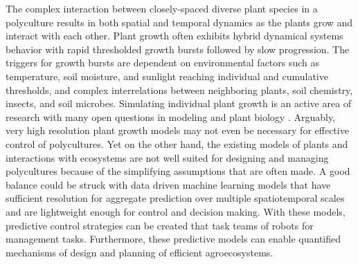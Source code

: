 The complex interaction between closely-spaced diverse plant species in a polyculture results in both spatial and temporal dynamics as the plants grow and interact with each other. %
Plant growth often exhibits hybrid dynamical systems behavior with rapid thresholded growth bursts followed by slow progression. The triggers for growth bursts are dependent on  environmental factors such as temperature, soil moisture, and sunlight reaching individual and cumulative thresholds, and complex interrelations between neighboring plants, soil chemistry, insects, and soil microbes. 
Simulating individual plant growth is an active area of research with many open questions in modeling and plant biology \cite{zhu2016plants}. Arguably, very high resolution plant growth models may not even be necessary for effective control of polycultures. Yet on the other hand, the  %
 existing models of plants and interactions with ecosystems \cite{Stehfest2007a,Foley1996a, Kucharik2003a,Friedl2010a, Rodrigues2010a, Nunes2013a} are not well suited for designing and managing polycultures because of the simplifying assumptions that are often made. A good balance could be struck with data driven machine learning models that have sufficient resolution for aggregate prediction over multiple spatiotemporal scales and are lightweight enough for control and decision making. With these models, predictive control strategies can be created that task teams of robots for management tasks. Furthermore, these predictive models can enable quantified mechanisms of design and planning of efficient agroecosystems. %
